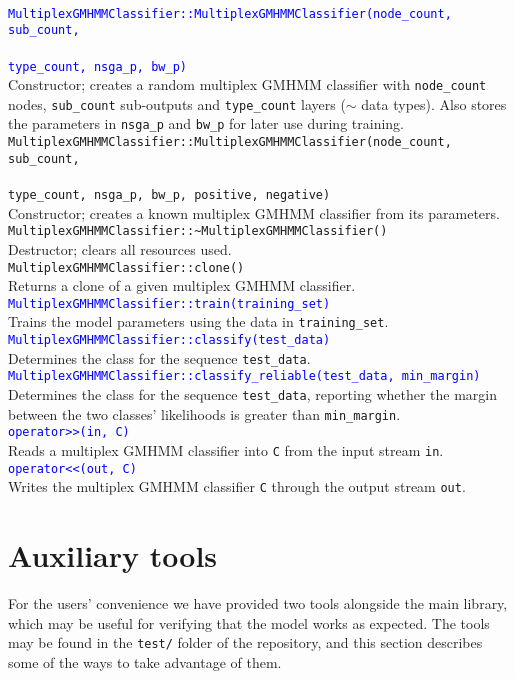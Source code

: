 \documentclass[12pt,openany]{article}
\newcommand{\fundef}[1]{\\\indent\indent\texttt{#1}\\}
\begin{document}
	\hfill\vspace*{-10pt}\fundef{\textcolor{blue}{MultiplexGMHMMClassifier::MultiplexGMHMMClassifier(node\_count, sub\_count,}}\vspace*{-15pt}\fundef{\textcolor{blue}{type\_count, nsga\_p, bw\_p)}}
	Constructor; creates a random multiplex GMHMM classifier with {\tt node\_count} nodes, {\tt sub\_count} sub-outputs and {\tt type\_count} layers ($\sim$ data types). Also stores the parameters in {\tt nsga\_p} and {\tt bw\_p} for later use during training.
	\fundef{MultiplexGMHMMClassifier::MultiplexGMHMMClassifier(node\_count, sub\_count,}\vspace*{-15pt}\fundef{type\_count, nsga\_p, bw\_p, positive, negative)}
	Constructor; creates a known multiplex GMHMM classifier from its parameters.
	\fundef{MultiplexGMHMMClassifier::\textasciitilde MultiplexGMHMMClassifier()}
	Destructor; clears all resources used.
	\fundef{MultiplexGMHMMClassifier::clone()}
	Returns a clone of a given multiplex GMHMM classifier.
	\fundef{\textcolor{blue}{MultiplexGMHMMClassifier::train(training\_set)}}
	Trains the model parameters using the data in {\tt training\_set}.
	\fundef{\textcolor{blue}{MultiplexGMHMMClassifier::classify(test\_data)}}
	Determines the class for the sequence {\tt test\_data}.
	\fundef{\textcolor{blue}{MultiplexGMHMMClassifier::classify\_reliable(test\_data, min\_margin)}}
	Determines the class for the sequence {\tt test\_data}, reporting whether the margin between the two classes' likelihoods is greater than {\tt min\_margin}.
	\fundef{\textcolor{blue}{operator>\/>(in, C)}}
	Reads a multiplex GMHMM classifier into {\tt C} from the input stream {\tt in}.
	\fundef{\textcolor{blue}{operator<\/<(out, C)}}
	Writes the multiplex GMHMM classifier {\tt C} through the output stream {\tt out}.
	
	\section{Auxiliary tools}\label{sec:auxx}
	For the users' convenience we have provided two tools alongside the main library, which may be useful for verifying that the model works as expected. The tools may be found in the {\tt test/} folder of the repository, and this section describes some of the ways to take advantage of them.
\end{document}

